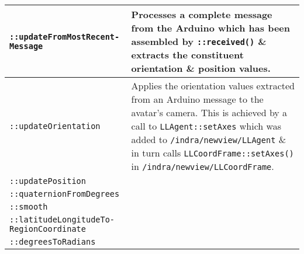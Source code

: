 \begin{center}
\begin{longtable}{| p{4.2cm} | p{10cm} |}
\hline


\texttt{::updateFromMostRecent- Message} & Processes a complete message from the Arduino which has been assembled by \texttt{::received()} \& extracts the constituent orientation \& position values. \\
		
\hline


\texttt{::updateOrientation} & Applies the orientation values extracted from an Arduino message to the avatar's camera. This is achieved by a call to \texttt{LLAgent::setAxes} which was added to \texttt{/indra/newview/LLAgent} \& in turn calls \texttt{LLCoordFrame::setAxes()} in \texttt{/indra/newview/LLCoordFrame}. \\
		
\hline


\texttt{::updatePosition} &  \\
		
\hline


\texttt{::quaternionFromDegrees} &  \\
		
\hline


\texttt{::smooth} &  \\
		
\hline


\texttt{::latitudeLongitudeTo- RegionCoordinate} &  \\
		
\hline


\texttt{::degreesToRadians}        &  \\
		
\hline


\end{longtable}
\end{center}


